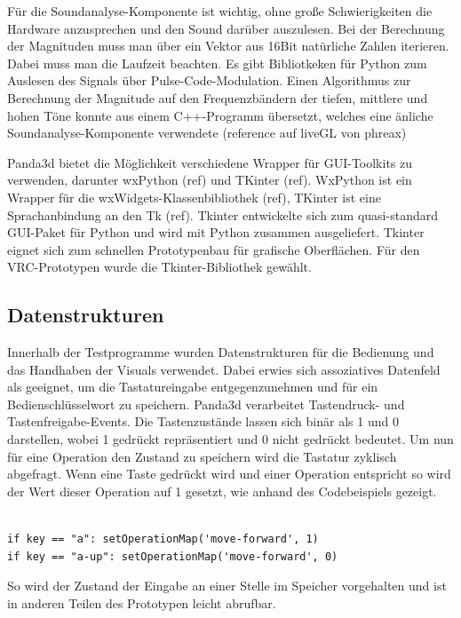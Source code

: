 F\"ur die Soundanalyse-Komponente ist wichtig, ohne gro\ss{}e Schwierigkeiten die Hardware anzusprechen und den Sound
dar\"uber auszulesen. Bei der Berechnung der Magnituden muss man \"uber ein Vektor aus 16Bit nat\"urliche Zahlen iterieren.
Dabei muss man die Laufzeit beachten. Es gibt Bibliotkeken f\"ur Python zum Auslesen des Signals \"uber Pulse-Code-Modulation.
Einen Algorithmus zur Berechnung der Magnitude auf den Frequenzb\"andern der tiefen, mittlere und hohen T\"one konnte
aus einem C++-Programm \"ubersetzt, welches eine \"anliche Soundanalyse-Komponente verwendete (reference auf liveGL von phreax)

Panda3d bietet die M\"oglichkeit verschiedene Wrapper f\"ur GUI-Toolkits zu verwenden, darunter wxPython (ref)  und TKinter (ref).
WxPython ist ein Wrapper f\"ur die wxWidgets-Klassenbibliothek (ref), TKinter ist eine Sprachanbindung an den Tk (ref).
Tkinter entwickelte sich zum quasi-standard GUI-Paket f\"ur Python und wird mit Python zusammen ausgeliefert.
Tkinter eignet sich zum schnellen Prototypenbau f\"ur grafische Oberfl\"achen. F\"ur den VRC-Prototypen wurde die
Tkinter-Bibliothek gew\"ahlt.

\subsection{Datenstrukturen}

Innerhalb der Testprogramme wurden Datenstrukturen f\"ur die Bedienung und das Handhaben der Visuals verwendet.
Dabei erwies sich assoziatives Datenfeld als geeignet, um die Tastatureingabe entgegenzunehmen und f\"ur ein
Bedienschl\"usselwort zu speichern. Panda3d verarbeitet Tastendruck- und Tastenfreigabe-Events. Die Tastenzust\"ande
lassen sich bin\"ar als 1 und 0 darstellen, wobei 1 gedr\"uckt repr\"asentiert und 0 nicht gedr\"uckt bedeutet.
Um nun f\"ur eine Operation den Zustand zu speichern wird die Tastatur zyklisch abgefragt. Wenn eine Taste gedr\"uckt wird
und einer Operation entspricht so wird der Wert dieser Operation auf 1 gesetzt, wie anhand des Codebeispiels gezeigt.

\begin{lstlisting}

if key == "a": setOperationMap('move-forward', 1)
if key == "a-up": setOperationMap('move-forward', 0)

\end{lstlisting}

So wird der Zustand der Eingabe an einer Stelle im Speicher vorgehalten und ist in anderen Teilen des
Prototypen leicht abrufbar.

